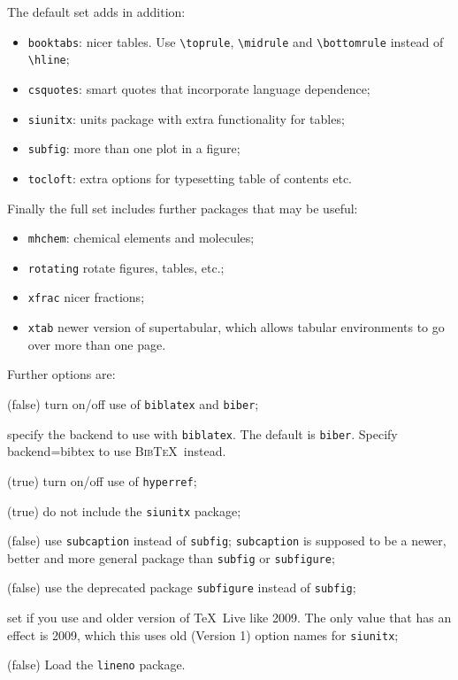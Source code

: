 \documentclass[atlasstyle,UKenglish]{latex/atlasdoc}
\newcommand{\BibTeX}{\textsc{Bib\TeX}}
\newcommand{\Macro}[1]{\texttt{\textbackslash #1}\xspace}
\newcommand{\Option}[1]{\textsf{#1}\xspace}
\newcommand{\Package}[1]{\texttt{#1}\xspace}
\begin{document}
The default set adds in addition:
\begin{itemize}\setlength{\parskip}{0pt}\setlength{\itemsep}{0pt}
\item \texttt{booktabs}: nicer tables. Use \Macro{toprule}, \Macro{midrule} and \Macro{bottomrule} instead of \Macro{hline};
\item \texttt{csquotes}: smart quotes that incorporate language dependence;
\item \texttt{siunitx}: units package with extra functionality for tables;
\item \texttt{subfig}: more than one plot in a figure;
\item \texttt{tocloft}: extra options for typesetting table of contents etc.
\end{itemize}

Finally the full set includes further packages that may be useful:
\begin{itemize}\setlength{\parskip}{0pt}\setlength{\itemsep}{0pt}
\item \texttt{mhchem}: chemical elements and molecules;
\item \texttt{rotating} rotate figures, tables, etc.;
\item \texttt{xfrac} nicer fractions;
\item \texttt{xtab} newer version of supertabular, which allows tabular environments to go over more than one page.
\end{itemize}

Further options are:
\begin{description}\setlength{\parskip}{0pt}\setlength{\itemsep}{0pt}
\item[\Option{biblatex=true|false}](false) turn on/off use of \Package{biblatex} and \Package{biber};
\item[\Option{backend=biber|bibtex}] specify the backend to use with \Package{biblatex}. The default is \Package{biber}.
  Specify \Option{backend=bibtex} to use \BibTeX\ instead.
\item[\Option{hyperref=true|false}](true) turn on/off use of \Package{hyperref};
\item[\Option{siunitx=true|false}](true) do not include the \Package{siunitx} package;
\item[\Option{subcaption=true|false}](false) use \Package{subcaption} instead of \Package{subfig};
  \Package{subcaption} is supposed to be a newer, better and more general package than \Package{subfig} or
  \Package{subfigure};
\item[\Option{subfigure=true|false}](false) use the deprecated package \Package{subfigure} 
  instead of \Package{subfig};
\item[\Option{texlive=2009}] set if you use and older version of \TeX\ Live like 2009.
  The only value that has an effect is 2009, 
  which this uses old (Version 1) option names for \Package{siunitx};
\item[\Option{lineno=true|false}](false) Load the \Package{lineno} package.
\end{description}
\end{document}
